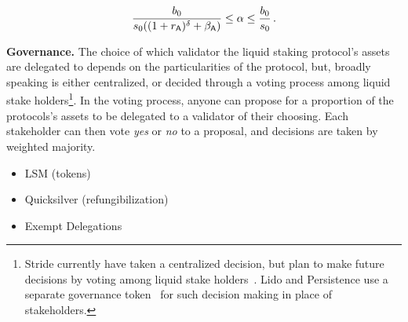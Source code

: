 \[
  \frac{b_0}{s_0 ((1 + r_{\textsf{A}})^\delta + \beta_{\textsf{A}})} \leq \alpha \leq \frac{b_0}{s_0}\,.
\]


%
%
%
%



\noindent
\textbf{Governance.}
The choice of which validator the liquid staking protocol's assets are delegated to
depends on the particularities of the protocol, but, broadly speaking
is either centralized, or decided through a voting process among
liquid stake holders\footnote{Stride currently have
taken a centralized decision, but plan to make future decisions by voting
among liquid stake holders~\cite{stride-validators}. Lido and Persistence
use a separate governance token~\cite{lido-validators,persistence-validators} for
such decision making in place of stakeholders.}.
In the voting process, anyone can propose for a proportion of the protocols's assets
to be delegated to a validator of their choosing.
Each stakeholder can then vote \emph{yes} or \emph{no}
to a proposal, and decisions are taken by weighted majority.

\begin{itemize}
  \item LSM (tokens)
  \item Quicksilver (refungibilization)
  \item Exempt Delegations
\end{itemize}
